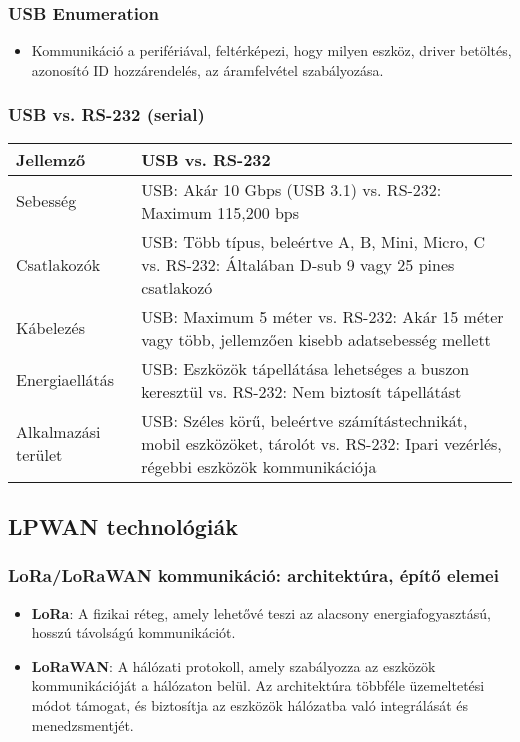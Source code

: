 \subsubsection{USB Enumeration}
\begin{itemize}
    \item Kommunikáció a perifériával, feltérképezi, hogy milyen eszköz, driver betöltés, azonosító ID hozzárendelés, az áramfelvétel szabályozása.
\end{itemize}

\clearpage
\subsubsection{USB vs. RS-232 (serial)}
\begin{table}[ht]
    \centering
    \begin{tabularx}{\textwidth}{X X}
    \toprule
    \textbf{Jellemző} & \textbf{USB vs. RS-232} \\
    \midrule
    Sebesség & USB: Akár 10 Gbps (USB 3.1) vs. RS-232: Maximum 115,200 bps \\
    \midrule
    Csatlakozók & USB: Több típus, beleértve A, B, Mini, Micro, C vs. RS-232: Általában D-sub 9 vagy 25 pines csatlakozó \\
    \midrule
    Kábelezés & USB: Maximum 5 méter vs. RS-232: Akár 15 méter vagy több, jellemzően kisebb adatsebesség mellett \\
    \midrule
    Energiaellátás & USB: Eszközök tápellátása lehetséges a buszon keresztül vs. RS-232: Nem biztosít tápellátást \\
    \midrule
    Alkalmazási terület & USB: Széles körű, beleértve számítástechnikát, mobil eszközöket, tárolót vs. RS-232: Ipari vezérlés, régebbi eszközök kommunikációja \\
    \bottomrule
    \end{tabularx}
    \label{table:usb_vs_rs232}
\end{table}

\clearpage
\subsection{LPWAN technológiák}
\subsubsection{LoRa/LoRaWAN kommunikáció: architektúra, építő elemei}
\begin{itemize}
    \item \textbf{LoRa}: A fizikai réteg, amely lehetővé teszi az alacsony energiafogyasztású, hosszú távolságú kommunikációt.
    \item \textbf{LoRaWAN}: A hálózati protokoll, amely szabályozza az eszközök kommunikációját a hálózaton belül. Az architektúra többféle üzemeltetési módot támogat, és biztosítja az eszközök hálózatba való integrálását és menedzsmentjét.
\end{itemize}

